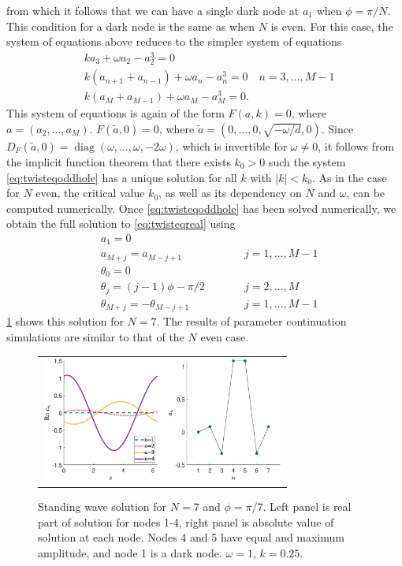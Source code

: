 \documentclass[reprint, amsmath,amssymb,aps,pra]{revtex4-2}
\DeclareMathOperator{\diag}{diag}
\begin{document}
from which it follows that we can have a single dark node at $a_1$ when $\phi = \pi/N$. This condition for a dark node is the same as when $N$ is even. For this case, the system of equations above reduces to the simpler system of equations
\begin{equation}\label{eq:twisteqoddhole}
\begin{aligned}
& k a_3 + \omega a_2 - a_2^3 = 0\\
&k( a_{n+1} + a_{n-1} ) + \omega a_n - a_n^3 = 0 \quad n = 3, \dots, M-1 \\
&k ( a_M + a_{M-1} ) + \omega a_M - a_M^3 = 0.
\end{aligned}
\end{equation}
This system of equations is again of the form $F(a,k) = 0$, where $a = (a_2, \dots, a_M)$. $F(\tilde{a}, 0) = 0$, where $\tilde{a} = (0, \dots, 0, \sqrt{-\omega/d}, 0)$. Since $D_F(\tilde{a}, 0) = \diag(\omega, \dots, \omega, -2\omega)$, which is invertible for $\omega \neq 0$, it follows from the implicit function theorem that there exists $k_0 > 0$ such the system \cref{eq:twisteqoddhole} has a unique solution for all $k$ with $|k| < k_0$. As in the case for $N$ even, the critical value $k_0$, as well as its dependency on $N$ and $\omega$, can be computed numerically. Once \cref{eq:twisteqoddhole} has been solved numerically, we obtain the full solution to \cref{eq:twisteqreal} using
\begin{align*}
&a_1 = 0 \\
&a_{M+j} = a_{M-j+1} && \qquad j = 1, \dots, M-1 \\
&\theta_0 = 0 \\
&\theta_j = (j-1)\phi - \pi/2 && \qquad j = 2, \dots, M \\
&\theta_{M+j} = -\theta_{M-j+1} && \qquad j = 1, \dots, M-1
\end{align*}
\cref{fig:oddhole7} shows this solution for $N=7$. The results of parameter continuation simulations are similar to that of the $N$ even case.
\begin{figure}
\begin{center}
\begin{tabular}{c}
\includegraphics[width=8cm]{oddhole7.eps}
\end{tabular}
\end{center}
\caption{Standing wave solution for $N = 7$ and $\phi = \pi/7$. Left panel is real part of solution for nodes 1-4, right panel is absolute value of solution at each node. Nodes 4 and 5 have equal and maximum amplitude, and node 1 is a dark node. $\omega = 1$, $k = 0.25$.}
\label{fig:oddhole7}
\end{figure}
\end{document}
